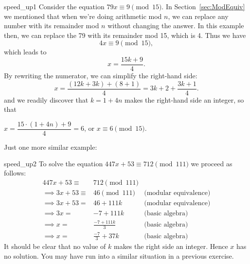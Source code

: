 \begin{example}{speed_up1}
Consider the equation $79x \equiv 9 \pmod{15}$. In Section~\ref{sec:ModEquiv} we mentioned that when we're doing arithmetic mod $n$, we can replace any number with its remainder mod $n$ without changing the answer. In this example then, we can replace the 79 with its remainder mod 15, which is 4. Thus we have
\[ 4x \equiv 9 \pmod{15}, \]
which leads to 
\[ x = \dfrac{15k +9}{4}. \]
By rewriting the numerator, we can simplify the right-hand side:
\[ x = \dfrac{(12k + 3k) + (8 + 1)}{4} = 3k + 2 + \dfrac{3k + 1}{4}. \]
and we readily discover that $k=1 + 4n$ makes the right-hand side an integer, so that 

\begin{center}
$x = \dfrac{15\cdot(1+4n) +9}{4} = 6$, or $x \equiv 6 \pmod{15}$.
\end{center}

\end{example}

Just one more similar example:

\begin{example}{speed_up2}
To solve the equation $447x + 53 \equiv 712 \pmod{111}$ we proceed as follows:
\begin{align*}
447x + 53 \equiv& 712 \pmod{111} \\
\implies 3x + 53 \equiv& 46 \pmod{111} &\text{(modular equivalence)} \\
 \implies 3x + 53 =& 46 + 111k &\text{(modular equivalence)}\\ 
 \implies 3x  =& -7 + 111k &\text{(basic algebra)}\\ 
 \implies x =& \frac{-7 +111k}{3} &\text{(basic algebra)}\\
 \implies x =& \frac{-7}{3} + 37k &\text{(basic algebra)}
 \end{align*}
It should be clear that no value of $k$  makes the right side an integer.  Hence $x$ has no solution. You may have run into a similar situation in a previous exercise.
\end{example}

